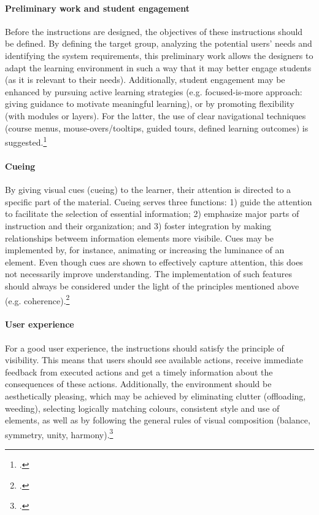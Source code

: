 \paragraph{Preliminary work and student engagement} Before the instructions are designed, the objectives of these instructions should be defined. By defining the target group, analyzing the potential users' needs and identifying the system requirements, this preliminary work allows the designers to adapt the learning environment in such a way that it may better engage students (as it is relevant to their needs). Additionally, student engagement may be enhanced by pursuing active learning strategies (e.g. focused-is-more approach: giving guidance to motivate meaningful learning), or by promoting flexibility (with modules or layers). For the latter, the use of clear navigational techniques (course menus, mouse-overs/tooltips, guided tours, defined learning outcomes) is suggested.\footcites[Cf.][]{}

\paragraph{Cueing} By giving visual cues (cueing) to the learner, their attention is directed to a specific part of the material. Cueing serves three functions:  1) guide the attention to facilitate the selection of essential information; 2) emphasize major parts of instruction and their organization; and 3) foster integration by making relationships betweem information elements more visibile. Cues may be implemented by, for instance, animating or increasing the luminance of an element. Even though cues are shown to effectively capture attention, this does not necessarily improve understanding. The implementation of such features should always be considered under the light of the principles mentioned above (e.g. coherence).\footcites[Cf.][pp.114 et seq]{deKoningFrameworkAttentionCueing2009}[cf.][chapter 2, paragraph 14]{ClarkElearningscienceinstruction2016}

\paragraph{User experience} For a good user experience, the instructions should satisfy the principle of visibility. This means that users should see available actions, receive immediate feedback from executed actions and get a timely information about the consequences of these actions. Additionally, the environment should be aesthetically pleasing, which may be achieved by eliminating clutter (offloading, weeding), selecting logically matching colours, consistent style and use of elements, as well as by following the general rules of visual composition (balance, symmetry, unity, harmony).\footcites[Cf.][pp. 16 et seq]{LeeScreenDesignGuidelines1999}[cf.][pp. 16 et seq]{Nadelhoffer10BestPractices}[cf.][p.20]{KirshInteractivitymultimediainterfaces1997}

